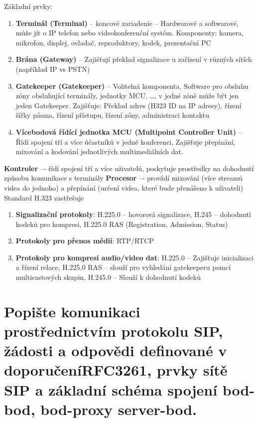 Základní prvky:
\begin{enumerate}
    \item \textbf{Terminál (Terminal)} -- koncové zariadenie -- Hardwarové a softwarové, může jít o IP telefon nebo videokonferenční systém. Komponenty: kamera, mikrofon, displej, ovladač, reproduktory, kodek, prezentační PC
    \item \textbf{Brána (Gateway)} -- Zajišťují překlad signalizace u zařízení v různých sítích (například IP vs PSTN)
    \item \textbf{Gatekeeper (Gatekeeper)} -- Volitelná komponenta, Software pro obsluhu zóny obsluhující terminály, jednotky MCU, …, v jedné zóně může být jen jeden Gatekeeper. Zajišťuje: Překlad adres (H323 ID na IP adresy), řízení šířky pásma, řízení přístupu, řízení zóny, administraci kontaktu
    \item \textbf{Vícebodová řídící jednotka MCU (Multipoint Controller Unit)} -- Řídí spojení tří a více  účastníků v jedné konferenci, Zajišťuje přepínání, mixování a kodování jednotlivých multimediálních dat.

\end{enumerate}
\textbf{Kontroler} –- řídí spojení tří a více uživatelů, poskytuje prostředky na dohodnutí způsobu komunikace s terminály \newline
\textbf{Procesor} –- provádí mixování (více streamů videa do jednoho) a přepínání (určení videa, které bude přenášeno
k uživateli)
\newline \newline
Standard H.323 zastřešuje
\begin{enumerate}
    \item \textbf{Signalizační protokoly}: H.225.0 – hovorová signalizace, H.245 – dohodnutí kodeků pro kompresi, H.225.0 RAS (Registration, Admission, Status)
    \item\textbf{ Protokoly pro přenos médií}: RTP/RTCP
    \item \textbf{Protokoly pro kompresi audio/video dat}: H.225.0 – Zajišťuje inicializaci a řízení relace, H.225.0 RAS – slouží pro vyhledání gatekeeperu pomcí multicastových skupin, H.245.0 – Slouží k dohodnutí kodeků
\end{enumerate}

\newpage
\section[Popište komunikaci prostřednictvím protokolu SIP, žádosti a odpovědi definované v doporučení RFC3261, prvky sítě SIP a základní schéma spojení bod-bod, bod-proxy server-bod.]{Popište komunikaci prostřednictvím protokolu SIP, žádosti a odpovědi definované v doporučení\newline RFC3261, prvky sítě SIP a základní schéma spojení bod-bod, bod-proxy server-bod.}
